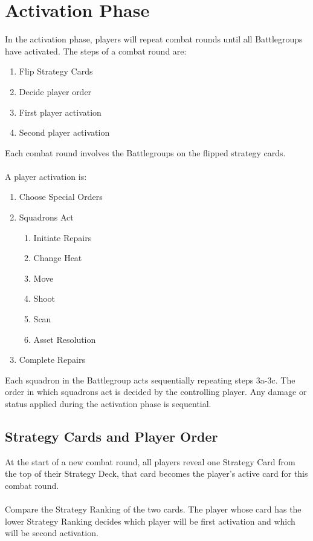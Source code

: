 \chapter{Activation Phase}

In the activation phase, players will repeat combat rounds until all Battlegroups have activated. The steps of a combat round are:
\begin{enumerate}
	\item Flip Strategy Cards
	\item Decide player order
	\item First player activation
	\item Second player activation
\end{enumerate}
Each combat round involves the Battlegroups on the flipped strategy cards.
\\\\
A player activation is:

\begin{enumerate}	
	\item Choose Special Orders
	\item Squadrons Act
	\begin{enumerate}
		\item Initiate Repairs
		\item Change Heat
		\item Move
		\item Shoot
		\item Scan
		\item Asset Resolution
	\end{enumerate}
		\item Complete Repairs
\end{enumerate}
Each squadron in the Battlegroup acts sequentially repeating steps 3a-3c. The order in which squadrons act is decided by the controlling player.
Any damage or status applied during the activation phase is sequential.

\section{Strategy Cards and Player Order}
At the start of a new combat round, all players reveal one Strategy Card from the top of their Strategy Deck, that card becomes the player's active card for this combat round.
\\\\
Compare the Strategy Ranking of the two cards. The player whose card has the lower Strategy Ranking decides which player will be first activation and which will be second activation. 

